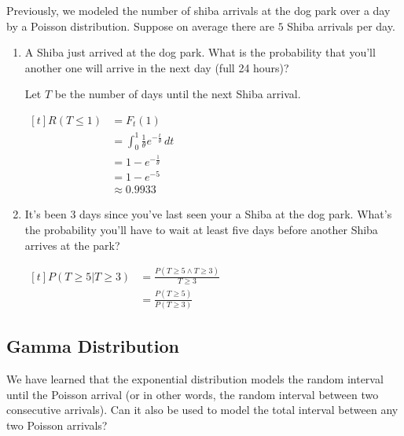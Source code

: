 
\begin{example}
    Previously, we modeled the number of shiba arrivals at the dog park over a day by a Poisson distribution. Suppose on average there are $5$ Shiba arrivals per day.

    \begin{enumerate}[label=\alph*)]
        \item A Shiba just arrived at the dog park. What is the probability that you'll another one will arrive in the next day (full 24 hours)?
        
        Let $T$ be the number of days until the next Shiba arrival. 

        $\begin{aligned}[t]
            R(T \le 1) & = F_t(1)                                               \\
                       & = \int_0^1 \frac{1}{\theta} e^{-\frac{t}{\theta}} \,dt \\
                       & = 1 - e^{-\frac{1}{\theta}}                            \\
                       & = 1 - e^{-5}                                           \\
                       & \approx 0.9933
        \end{aligned}$

        \item It's been 3 days since you've last seen your a Shiba at the dog park. What's the probability you'll have to wait at least five days before another Shiba arrives at the park?
        
        $\begin{aligned}[t]
            P(T \ge 5 | T \ge 3) & = \frac{P(T \ge 5 \land T \ge 3)}{T \ge 3} \\
                                 & = \frac{P(T \ge 5)}{P(T \ge 3)}
        \end{aligned}$
    \end{enumerate}
\end{example}

\subsection{Gamma Distribution}

We have learned that the exponential distribution models the random interval until the  Poisson arrival (or in other words, the random interval between two consecutive arrivals). Can it also be used to model the total interval between any two Poisson arrivals?

